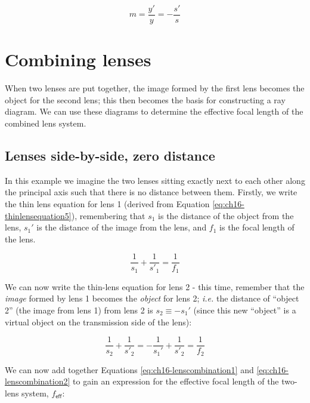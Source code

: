 \documentclass[
]{book}
\begin{document}
\begin{equation}
m = \frac{y'}{y} = -\frac{s'}{s}
\end{equation}

\hypertarget{sec-ch16-lenscombination1}{%
\section{Combining lenses}\label{sec-ch16-lenscombination1}}

When two lenses are put together, the image formed by the first lens becomes the object for the second lens; this then becomes the basis for constructing a ray diagram. We can use these diagrams to determine the effective focal length of the combined lens system.

\hypertarget{sec-ch16-2lenszerodistance}{%
\subsection{Lenses side-by-side, zero distance}\label{sec-ch16-2lenszerodistance}}

In this example we imagine the two lenses sitting exactly next to each other along the principal axis such that there is no distance between them. Firstly, we write the thin lens equation for lens 1 (derived from Equation \eqref{eq:ch16-thinlensequation5}), remembering that \(s_1\) is the distance of the object from the lens, \(s_1'\) is the distance of the image from the lens, and \(f_1\) is the focal length of the lens.

\begin{equation}
\frac{1}{s_1} + \frac{1}{s'_1} = \frac{1}{f_1}
\label{eq:ch16-lenscombination1}
\end{equation}

We can now write the thin-lens equation for lens 2 - this time, remember that the \emph{image} formed by lens 1 becomes the \emph{object} for lens 2; \emph{i.e.} the distance of ``object 2'' (the image from lens 1) from lens 2 is \(s_2 \equiv - s_1'\) (since this new ``object'' is a virtual object on the transmission side of the lens):

\begin{equation}
\frac{1}{s_2} + \frac{1}{s'_2} = -\frac{1}{s_1'} + \frac{1}{s'_2}= \frac{1}{f_2}
\label{eq:ch16-lenscombination2}
\end{equation}

We can now add together Equations \eqref{eq:ch16-lenscombination1} and \eqref{eq:ch16-lenscombination2} to gain an expression for the effective focal length of the two-lens system, \(f_{\textsf{eff}}\):
\end{document}
